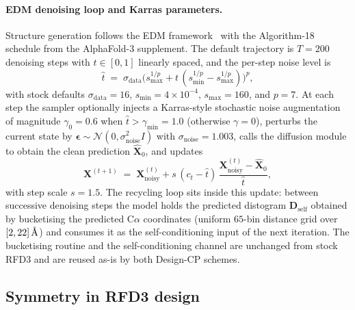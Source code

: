 \documentclass{article}
\theoremstyle{plain}
\theoremstyle{definition}
\theoremstyle{remark}
\begin{document}
\paragraph{EDM denoising loop and Karras parameters.}
\label{app:edm-loop}
Structure generation follows the EDM framework~\cite{karras_elucidating_2022} with the Algorithm-18 schedule from the AlphaFold-3 supplement. The default trajectory is $T=200$ denoising steps with $t\in[0,1]$ linearly spaced, and the per-step noise level is
\begin{equation}
\hat{t} \;=\; \sigma_\text{data}\bigl(s_\text{max}^{1/p} + t\,(s_\text{min}^{1/p}-s_\text{max}^{1/p})\bigr)^{p},
\label{eq:edm-schedule}
\end{equation}
with stock defaults $\sigma_\text{data}=16$, $s_\text{min}=4\!\times\!10^{-4}$, $s_\text{max}=160$, and $p=7$. At each step the sampler optionally injects a Karras-style stochastic noise augmentation of magnitude $\gamma_0=0.6$ when $\hat{t}>\gamma_\text{min}=1.0$ (otherwise $\gamma=0$), perturbs the current state by $\boldsymbol{\epsilon}\sim\mathcal{N}(0,\sigma_\text{noise}^{2}I)$ with $\sigma_\text{noise}=1.003$, calls the diffusion module to obtain the clean prediction $\hat{\mathbf{X}}_0$, and updates
\begin{equation}
\mathbf{X}^{(t+1)} \;=\; \mathbf{X}^{(t)}_\text{noisy} + s\,(c_t-\hat{t})\,\frac{\mathbf{X}^{(t)}_\text{noisy}-\hat{\mathbf{X}}_0}{\hat{t}},
\label{eq:edm-step}
\end{equation}
with step scale $s=1.5$. The recycling loop sits inside this update: between successive denoising steps the model holds the predicted distogram $\mathbf{D}_\text{self}$ obtained by bucketising the predicted C$\alpha$ coordinates (uniform $65$-bin distance grid over $[2,22]\,\textup{\AA}$) and consumes it as the self-conditioning input of the next iteration. The bucketising routine and the self-conditioning channel are unchanged from stock RFD3 and are reused as-is by both Design-CP schemes.

\subsection{Symmetry in RFD3 design}
\label{app:symmetry}
\end{document}
